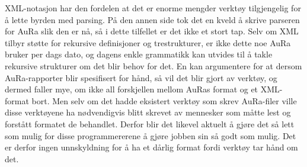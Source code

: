 \documentclass[norsk, 11pt, a4paper]{article}
\begin{document}
XML-notasjon har den fordelen at det er enorme mengder verktøy tilgjengelig for å lette byrden med parsing. På den annen side tok det en kveld å skrive parseren for AuRa slik den er nå, så i dette tilfellet er det ikke et stort tap.
Selv om XML tilbyr støtte for rekursive definisjoner og trestrukturer, er ikke dette noe AuRa bruker per dags dato, og dagens enkle grammatikk kan utvides til å takle rekursive strukturer om det blir behov for det.
En kan argumentere for at dersom AuRa-rapporter blir spesifisert for hånd, så vil det blir gjort av verktøy, og dermed faller mye, om ikke all forskjellen mellom AuRas format og et XML-format bort. Men selv om det hadde eksistert verktøy som skrev AuRa-filer ville disse verktøyene ha nødvendigvis blitt skrevet av mennesker som måtte lest og forstått formatet de behandlet. Derfor blir det likevel aktuelt å gjøre det så lett som mulig for disse programmererene å gjøre jobben sin så godt som mulig.
Det er derfor ingen unnskyldning for å ha et dårlig format fordi verktøy tar hånd om det. 


\newpage


{} %
\end{document}
